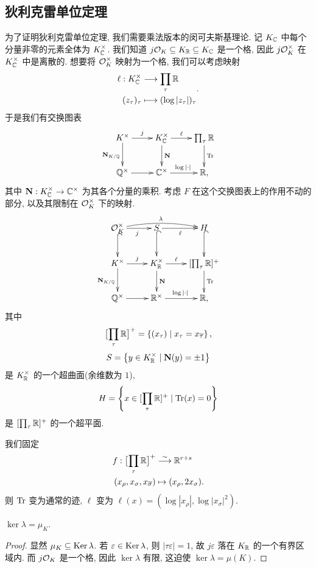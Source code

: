 \subsection{狄利克雷单位定理}
为了证明狄利克雷单位定理, 我们需要乘法版本的闵可夫斯基理论.
记 $K_{\mathbb{C}}$ 中每个分量非零的元素全体为 $K_{\mathbb{C}}^\times$.
我们知道 $j{\mathcal{O}}_K\subseteq K_{\mathbb{R}}\subseteq K_{\mathbb{C}}$ 是一个格, 因此 $j{\mathcal{O}}_K^\times$ 在 $K_{\mathbb{C}}^\times$ 中是离散的. 想要将 ${\mathcal{O}}_K^\times$ 映射为一个格, 我们可以考虑映射
  \[\begin{split}\ell:K_{\mathbb{C}}^\times &\longrightarrow \prod_\tau{\mathbb{R}} \\ (z_\tau)_\tau &\longmapsto (\log|z_\tau|)_\tau\end{split}.\]
于是我们有交换图表
  \[\xymatrix{
    K^\times\ar[r]^j\ar[d]_{\bfN_{K/\BQ}} & K_\BC^\times \ar[r]^-\ell\ar[d]^\bfN & \prod_\tau \BR\ar[d]^\Tr\\
    \BQ^\times\ar[r]&\BC^\times\ar[r]^{\log|\cdot|}&\BR,
  }\]
其中 ${\mathbf{N}}:K_{\mathbb{C}}^\times\to{\mathbb{C}}^\times$ 为其各个分量的乘积.
考虑 $F$ 在这个交换图表上的作用不动的部分, 以及其限制在 ${\mathcal{O}}_K^\times$ 下的映射.
  \[\xymatrix{
    \CO_K^\times\ar[r]_j\ar@{^(->}[d]\ar@/^/[rr]^{\lambda}
    &S\ar[r]_\ell\ar@{^(->}[d]
    &H\ar@{^(->}[d]\\
    K^\times\ar[r]^j\ar[d]_{\bfN_{K/\BQ}} & K_\BR^\times \ar[r]^-\ell\ar[d]^\bfN & [\prod_\tau \BR]^+\ar[d]^\Tr\\
    \BQ^\times\ar[r]&\BR^\times\ar[r]^{\log|\cdot|}&\BR,
  }\]
其中 
  \[\bigl[\prod_\tau {\mathbb{R}}\bigr]^+=\left\{(x_\tau)\mid x_{\tau}=x_{\overline \tau}\right\},\]
  \[S=\left\{y\in K_{\mathbb{R}}^\times\mid {\mathbf{N}}(y)=\pm 1\right\}\]
是 $K_{\mathbb{R}}^\times$ 的一个超曲面(余维数为 $1$),
  \[H=\left\{x\in [\prod_\tau {\mathbb{R}}]^+\mid {\mathrm{Tr}}(x)=0\right\}\]
是 $[\prod_\tau {\mathbb{R}}]^+$ 的一个超平面.

我们固定
  \[\begin{split}
f:\bigl[\prod_\tau {\mathbb{R}}\bigr]^+&\stackrel{\sim}{\longrightarrow} {\mathbb{R}}^{r+s}\\
(x_\rho,x_\sigma,x_{\overline \sigma})&\mapsto (x_\rho,2x_\sigma).
\end{split}\]
则 ${\mathrm{Tr}}$ 变为通常的迹, $\ell$ 变为 $\ell(x)=(\log|x_\rho|,\log|x_\sigma|^2).$

\begin{proposition}{}{}
$\ker\lambda=\mu_K$.
\end{proposition}
\begin{proof}
显然 $\mu_K\subseteq {\mathrm{Ker}\,}\lambda$. 若 $\varepsilon\in{\mathrm{Ker}\,}\lambda$, 则 $|\tau \varepsilon|=1$, 故 $j\varepsilon$ 落在 $K_{\mathbb{R}}$ 的一个有界区域内. 而 $j{\mathcal{O}}_K$ 是一个格, 因此 $\ker\lambda$ 有限, 这迫使 $\ker\lambda=\mu(K)$.
\end{proof}

